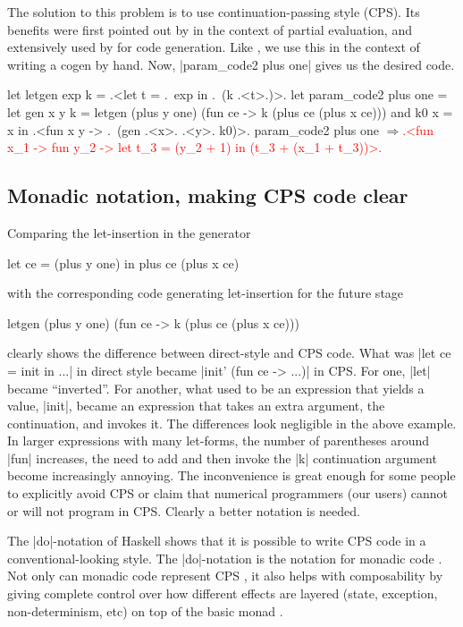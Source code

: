 \documentclass[draft]{elsart}
\newcommand{\evalresult}[1]{\ensuremath{\Longrightarrow}\textcolor{red}{#1}}
\begin{document}
The solution to this problem is to use continuation-passing style (CPS). Its
benefits were first pointed out by \cite{Bondorf:92} in the context of partial
evaluation, and extensively used by \cite{MSP:PADL04,KiselyovTaha} for
code generation. Like \cite{conf/pepm/BondorfD94}, we use this in the 
context of writing a cogen by hand.  Now, |param_code2 plus one| gives us the
desired code.

\begin{code}
let letgen exp k = .<let t = .~exp in .~(k .<t>.)>.
let param_code2 plus one =
  let gen x y k = letgen (plus y one)
                         (fun ce -> k (plus ce (plus x ce)))
  and k0 x = x
  in .<fun x y -> .~(gen .<x>. .<y>. k0)>.
param_code2 plus one
\evalresult{.<fun x_1 -> fun y_2 -> let t_3 = (y_2 + 1) in (t_3 + (x_1 + t_3))>.}
\end{code}

\subsection{Monadic notation, making CPS code clear}\label{monadicnotation}

Comparing the let-insertion in the generator
\begin{code}
let ce = (plus y one) in  plus ce (plus x ce)
\end{code}
with the corresponding code generating let-insertion for the future
stage
\begin{code}
letgen (plus y one) (fun ce -> k (plus ce (plus x ce)))
\end{code}
clearly shows the difference between  direct-style and CPS code.
What was |let ce = init in ...| in direct style became
|init' (fun ce -> ...)| in CPS. For one, |let| became
``inverted''. For another, what used to be an expression that yields
a value, |init|, became an expression that takes an extra argument,
the continuation, and invokes it. The differences look negligible in
the above example. In larger expressions with many let-forms, the
number of parentheses around |fun| increases, the need to add and
then invoke the |k| continuation argument become increasingly annoying. The
inconvenience is great enough for some people to explicitly avoid CPS
or claim that numerical programmers (our users) cannot or will not
program in CPS. Clearly a better notation is needed.

The |do|-notation of Haskell \cite{Haskell98Report} shows that it is possible
to write CPS code in a conventional-looking style. The
|do|-notation is the notation for monadic code \cite{moggi-notions}.
Not only can monadic code represent CPS \cite{Filinski:Representing},
it also helps with composability by giving complete control over how
different effects are layered
(state, exception, non-determinism, etc) on top of the
basic monad \cite{liang-interpreter}.
\end{document}
